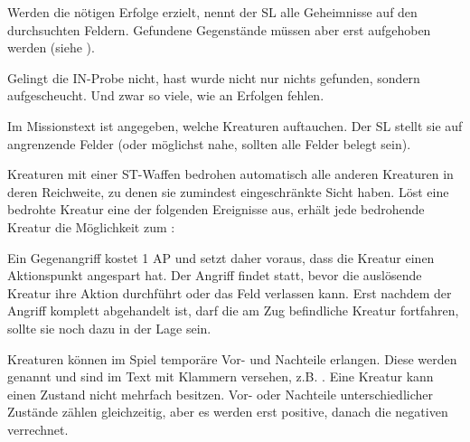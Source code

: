 {			

			\noindent
			Werden die nötigen Erfolge erzielt, nennt der SL alle Geheimnisse auf den durchsuchten Feldern. Gefundene Gegenstände müssen aber erst aufgehoben werden (siehe ).

			Gelingt die IN-Probe nicht, hast wurde nicht nur nichts gefunden, sondern  aufgescheucht. Und zwar so viele, wie an Erfolgen fehlen.


			\noindent
			Im Missionstext ist angegeben, welche Kreaturen auftauchen. Der SL stellt sie auf angrenzende Felder (oder möglichst nahe, sollten alle Felder belegt sein).

		Kreaturen mit einer ST-Waffen bedrohen automatisch alle anderen Kreaturen in deren Reichweite, zu denen sie zumindest eingeschränkte Sicht haben. Löst eine bedrohte Kreatur eine der folgenden Ereignisse aus, erhält jede bedrohende Kreatur die Möglichkeit zum :


		\noindent
		Ein Gegenangriff kostet 1 AP und setzt daher voraus, dass die Kreatur einen Aktionspunkt angespart hat. Der Angriff findet statt, bevor die auslösende Kreatur ihre Aktion durchführt oder das Feld verlassen kann. Erst nachdem der Angriff komplett abgehandelt ist, darf die am Zug befindliche Kreatur fortfahren, sollte sie noch dazu in der Lage sein.

		Kreaturen können im Spiel temporäre Vor- und Nachteile erlangen. Diese werden  genannt und sind im Text mit Klammern versehen, z.B. . Eine Kreatur kann einen Zustand nicht mehrfach besitzen. Vor- oder Nachteile unterschiedlicher Zustände zählen gleichzeitig, aber es werden erst positive, danach die negativen verrechnet.

}
